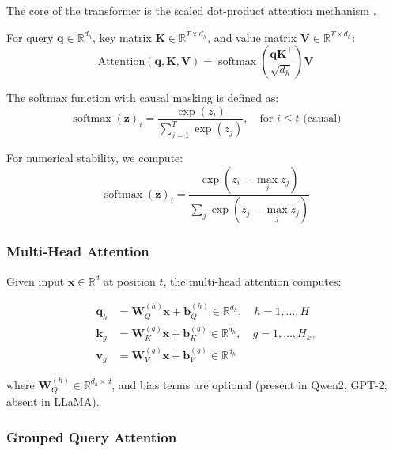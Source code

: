 \documentclass[12pt,a4paper]{article}
\DeclareMathOperator*{\softmax}{softmax}
\begin{document}
The core of the transformer is the scaled dot-product attention mechanism \citep{vaswani2017attention}.

\begin{eqbox}
For query $\bm{q} \in \mathbb{R}^{d_h}$, key matrix $\bm{K} \in \mathbb{R}^{T \times d_h}$, and value matrix $\bm{V} \in \mathbb{R}^{T \times d_h}$:
\begin{equation}
\text{Attention}(\bm{q}, \bm{K}, \bm{V}) = \softmax\left(\frac{\bm{q}\bm{K}^\top}{\sqrt{d_h}}\right) \bm{V}
\label{eq:attention}
\end{equation}
\end{eqbox}

The softmax function with causal masking is defined as:
\begin{equation}
\softmax(\bm{z})_i = \frac{\exp(z_i)}{\sum_{j=1}^{T} \exp(z_j)}, \quad \text{for } i \leq t \text{ (causal)}
\label{eq:softmax}
\end{equation}

For numerical stability, we compute:
\begin{equation}
\softmax(\bm{z})_i = \frac{\exp(z_i - \max_j z_j)}{\sum_{j} \exp(z_j - \max_j z_j)}
\label{eq:softmax_stable}
\end{equation}

\subsubsection{Multi-Head Attention}

Given input $\bm{x} \in \mathbb{R}^d$ at position $t$, the multi-head attention computes:

\begin{align}
\bm{q}_h &= \bm{W}_Q^{(h)} \bm{x} + \bm{b}_Q^{(h)} \in \mathbb{R}^{d_h}, \quad h = 1, \ldots, H \label{eq:q_proj} \\
\bm{k}_g &= \bm{W}_K^{(g)} \bm{x} + \bm{b}_K^{(g)} \in \mathbb{R}^{d_h}, \quad g = 1, \ldots, H_{kv} \label{eq:k_proj} \\
\bm{v}_g &= \bm{W}_V^{(g)} \bm{x} + \bm{b}_V^{(g)} \in \mathbb{R}^{d_h} \label{eq:v_proj}
\end{align}

where $\bm{W}_Q^{(h)} \in \mathbb{R}^{d_h \times d}$, and bias terms are optional (present in Qwen2, GPT-2; absent in LLaMA).

\subsubsection{Grouped Query Attention}
\end{document}

